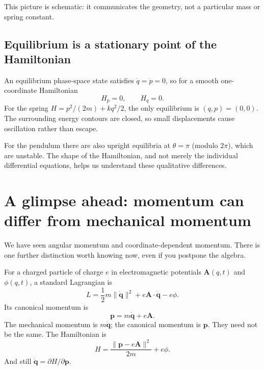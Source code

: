 \documentclass[11pt,a4paper,oneside]{article}
\begin{document}
\begin{center}
\end{center}
This picture is schematic: it communicates the geometry, not a particular mass or spring constant.

\subsection{Equilibrium is a stationary point of the Hamiltonian}
An equilibrium phase-space state satisfies $\dot q=\dot p=0$, so for a smooth one-coordinate Hamiltonian
\[
 H_p=0,\qquad H_q=0.
\]
For the spring $H=p^2/(2m)+kq^2/2$, the only equilibrium is $(q,p)=(0,0)$. The surrounding energy contours are closed, so small displacements cause oscillation rather than escape.

For the pendulum there are also upright equilibria at $\theta=\pi$ (modulo $2\pi$), which are unstable. The shape of the Hamiltonian, and not merely the individual differential equations, helps us understand these qualitative differences.

\section{A glimpse ahead: momentum can differ from mechanical momentum}
We have seen angular momentum and coordinate-dependent momentum. There is one further distinction worth knowing now, even if you postpone the algebra.

For a charged particle of charge $e$ in electromagnetic potentials $\boldsymbol A(q,t)$ and $\phi(q,t)$, a standard Lagrangian is
\[
 L=\frac12m\lVert\dot{\boldsymbol q}\rVert^2
 +e\boldsymbol A\cdot\dot{\boldsymbol q}-e\phi.
\]
Its canonical momentum is
\[
 \boxed{\boldsymbol p=m\dot{\boldsymbol q}+e\boldsymbol A.}
\]
The mechanical momentum is $m\dot{\boldsymbol q}$; the canonical momentum is $\boldsymbol p$. They need not be the same. The Hamiltonian is
\[
 H=\frac{\lVert\boldsymbol p-e\boldsymbol A\rVert^2}{2m}+e\phi.
\]
And still $\dot{\boldsymbol q}=\partial H/\partial\boldsymbol p$.
\end{document}
